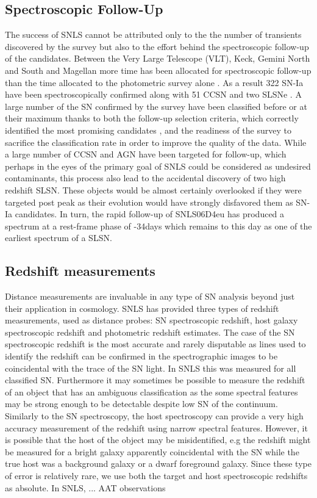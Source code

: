 \subsection{Spectroscopic Follow-Up}
The success of SNLS cannot be attributed only to the the number of transients discovered by the survey but also to the effort behind the spectroscopic follow-up of the candidates. Between the Very Large Telescope (VLT), Keck, Gemini North and South and Magellan more time has been allocated for spectroscopic follow-up than the time allocated to the photometric survey alone \citep{Pritchet2004}. As a result 322 SN-Ia have been spectroscopically confirmed along with 51 CCSN and two SLSNe \citep{Guy2010,Howell2005,Howell2013}. A large number of the SN confirmed by the survey have been classified before or at their maximum thanks to both the follow-up selection criteria, which correctly identified the most promising candidates \citep{Sullivan2006}, and the readiness of the survey to sacrifice the classification rate in order to improve the quality of the data. While a large number of CCSN and AGN have been targeted for follow-up, which perhaps in the eyes of the primary goal of SNLS could be considered as undesired contaminants, this process also lead to the accidental discovery of two high redshift SLSN. These objects would be almost certainly overlooked if they were targeted post peak as their evolution would have strongly disfavored them as SN-Ia candidates. In turn, the rapid follow-up of SNLS06D4eu has produced a spectrum at a rest-frame phase of -34days which remains to this day as one of the earliest spectrum of a SLSN.        

\subsection{Redshift measurements}
Distance measurements are invaluable in any type of SN analysis beyond just their application in cosmology. SNLS has provided three types of redshift measurements, used as distance probes: SN spectroscopic redshift, host galaxy spectroscopic redshift and photometric redshift estimates. The case of the SN spectroscopic redshift is the most accurate and rarely disputable as lines used to identify the redshift can be confirmed in the spectrographic images to be coincidental with the trace of the SN light. In SNLS this was measured for all classified SN. Furthermore it may sometimes be possible to measure the redshift of an object that has an ambiguous classification as the some spectral features may be strong enough to be detectable despite low S\/N of the continuum. Similarly to the SN spectroscopy, the host spectroscopy can provide a very high accuracy measurement of the redshift using narrow spectral features. However, it is possible that the host of the object may be misidentified, e.g the redshift might be measured for a bright galaxy apparently coincidental with the SN while the true host was a background galaxy or a dwarf foreground galaxy. Since these type of error is relatively rare, we use both the target and host spectroscopic redshifts as absolute. In SNLS, ... AAT observations

